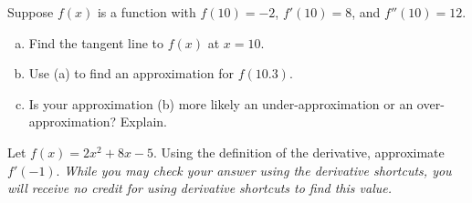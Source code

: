 \documentclass[12pt,letterpaper]{exam}
\begin{document}
\begin{questions}
\question[8] Suppose $f(x)$ is a function with $f(10)= -2$, $f'(10)= 8$, and $f''(10)= 12$. 
	\begin{enumerate}[(a)]
	\item Find the tangent line to $f(x)$ at $x= 10$. \vfill
	\item Use (a) to find an approximation for $f(10.3)$. \vfill
	\item Is your approximation (b) more likely an under-approximation or an over-approximation? Explain. \vfill
	\end{enumerate}



\newpage
\question[7] Let $f(x)= 2x^2 + 8x - 5$. Using the definition of the derivative, approximate $f'(-1)$. {\itshape While you may check your answer using the derivative shortcuts, you will receive no credit for using derivative shortcuts to find this value.}

\end{questions}
\end{document}
